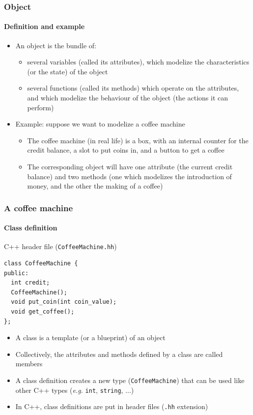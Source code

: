 \documentclass{beamer}
\begin{document}
\begin{frame}
  \frametitle{Object}
  \framesubtitle{Definition and example}
  \begin{itemize}
  \item An \alert{object} is the bundle of:
    \begin{itemize}
    \item several variables (called its \alert{attributes}), which modelize the characteristics (or the state) of the object
    \item several functions (called its \alert{methods}) which operate on the attributes, and which modelize the behaviour of the object (the actions it can perform)
    \end{itemize}
  \item Example: suppose we want to modelize a coffee machine
    \begin{itemize}
    \item The coffee machine (in real life) is a box, with an internal counter for the credit balance, a slot to put coins in, and a button to get a coffee
    \item The corresponding object will have one attribute (the current credit balance) and two methods (one which modelizes the introduction of money, and the other the making of a coffee)
    \end{itemize}
  \end{itemize}
\end{frame}

\begin{frame}[fragile]
  \frametitle{A coffee machine}
  \framesubtitle{Class definition}
  \begin{block}{C++ header file (\texttt{CoffeeMachine.hh})}
    \begin{scriptsize}
\begin{verbatim}
class CoffeeMachine {
public:
  int credit;
  CoffeeMachine();
  void put_coin(int coin_value);
  void get_coffee();
};
\end{verbatim}
      \end{scriptsize}
  \end{block}
  \begin{itemize}
  \item A \alert{class} is a template (or a blueprint) of an object
  \item Collectively, the attributes and methods defined by a class are called \alert{members}
  \item A class definition creates a new \alert{type} (\texttt{CoffeeMachine}) that can be used like other C++ types (\textit{e.g.} \texttt{int}, \texttt{string}, ...)
  \item In C++, class definitions are put in header files (\texttt{.hh} extension)
  \end{itemize}
\end{frame}
\end{document}
